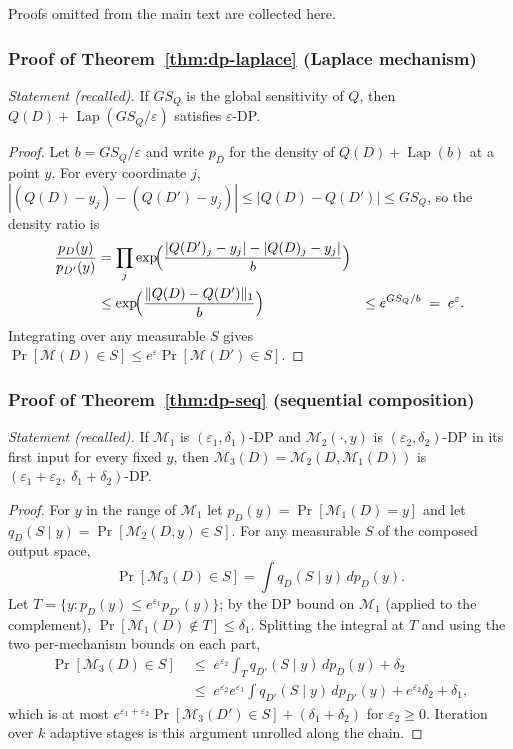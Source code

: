 Proofs omitted from the main text are collected here.

\subsubsection*{Proof of Theorem~\ref{thm:dp-laplace} (Laplace mechanism)}
{\itshape Statement (recalled).} If $GS_Q$ is the global sensitivity of $Q$, then
$Q(D) + \operatorname{Lap}(GS_Q/\varepsilon)$ satisfies $\varepsilon$-DP.\eop

\begin{proof}
Let $b = GS_Q/\varepsilon$ and write $p_D$ for the density of
$Q(D) + \operatorname{Lap}(b)$ at a point $y$. For every coordinate $j$,
$|(Q(D) - y_j) - (Q(D') - y_j)| \le |Q(D) - Q(D')| \le GS_Q$, so the density ratio is
\begin{align*}
\frac{p_D(y)}{p_{D'}(y)}
&= \prod_j \exp\!\Bigl(\frac{|Q(D')_j - y_j| - |Q(D)_j - y_j|}{b}\Bigr)\\
&\le \exp\!\Bigl(\frac{\|Q(D)-Q(D')\|_1}{b}\Bigr)
&\le e^{GS_Q/b} \;=\; e^{\varepsilon}.
\end{align*}
Integrating over any measurable $S$ gives
$\Pr[\mathcal{M}(D) \in S] \le e^{\varepsilon}\Pr[\mathcal{M}(D') \in S]$.
\end{proof}

\subsubsection*{Proof of Theorem~\ref{thm:dp-seq} (sequential composition)}
{\itshape Statement (recalled).} If $\mathcal{M}_1$ is
$(\varepsilon_1,\delta_1)$-DP and $\mathcal{M}_2(\cdot,y)$ is
$(\varepsilon_2,\delta_2)$-DP in its first input for every fixed $y$, then
$\mathcal{M}_3(D) = \mathcal{M}_2(D,\mathcal{M}_1(D))$ is
$(\varepsilon_1{+}\varepsilon_2,\ \delta_1{+}\delta_2)$-DP.\eop

\begin{proof}
For $y$ in the range of $\mathcal{M}_1$ let $p_D(y) = \Pr[\mathcal{M}_1(D) = y]$ and
let $q_D(S \mid y) = \Pr[\mathcal{M}_2(D,y) \in S]$. For any measurable $S$ of the
composed output space,
\[
\Pr[\mathcal{M}_3(D) \in S]
= \int q_D(S \mid y)\, d p_D(y).
\]
Let $T = \{y : p_D(y) \le e^{\varepsilon_1} p_{D'}(y)\}$; by the DP bound on
$\mathcal{M}_1$ (applied to the complement), $\Pr[\mathcal{M}_1(D) \notin T] \le
\delta_1$. Splitting the integral at $T$ and using the two per-mechanism bounds on each
part,
\begin{align*}
\Pr[\mathcal{M}_3(D) \in S]
&\;\le\; e^{\varepsilon_2}\!\int_T q_{D'}(S\mid y)\, d p_D(y) + \delta_2\\
&\;\le\; e^{\varepsilon_2} e^{\varepsilon_1}\!\int q_{D'}(S\mid y)\, d p_{D'}(y)
+ e^{\varepsilon_2}\delta_2 + \delta_1,
\end{align*}
which is at most $e^{\varepsilon_1+\varepsilon_2}
\Pr[\mathcal{M}_3(D') \in S] + (\delta_1+\delta_2)$ for $\varepsilon_2 \ge 0$.
Iteration over $k$ adaptive stages is this argument unrolled along the chain.
\end{proof}

